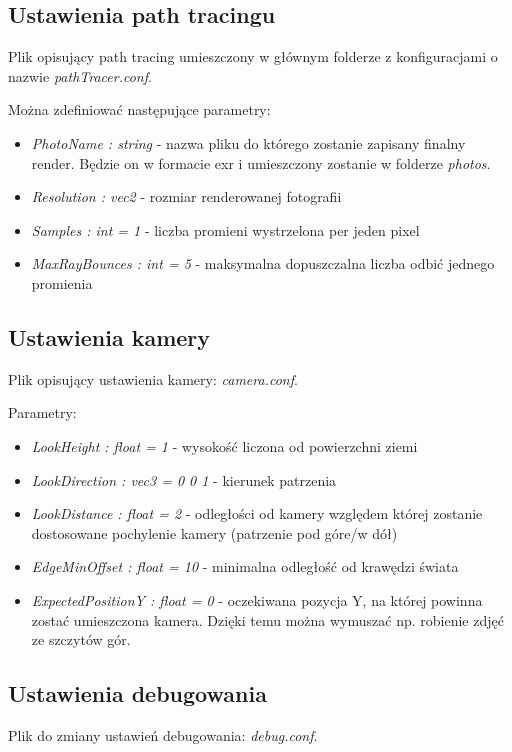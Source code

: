 \documentclass[inz,longabstract]{iithesis}
\begin{document}
        \subsection{Ustawienia path tracingu}
        Plik opisujący path tracing umieszczony w głównym folderze z konfiguracjami o nazwie \textit{pathTracer.conf}.
        
        Można zdefiniować następujące parametry:
        \begin{itemize}
            \item \textit{PhotoName : string} - nazwa pliku do którego zostanie zapisany finalny render. Będzie on w formacie exr i umieszczony zostanie w folderze \textit{photos}.
            \item \textit{Resolution : vec2} - rozmiar renderowanej fotografii
            \item \textit{Samples : int = 1} - liczba promieni wystrzelona per jeden pixel
            \item \textit{MaxRayBounces : int = 5} - maksymalna dopuszczalna liczba odbić jednego promienia  
        \end{itemize}

        \subsection{Ustawienia kamery}
        Plik opisujący ustawienia kamery: \textit{camera.conf}.
        
        Parametry:
        \begin{itemize}
            \item \textit{LookHeight : float = 1} - wysokość liczona od  powierzchni ziemi 
            \item \textit{LookDirection : vec3 = 0 0 1} - kierunek patrzenia 
            \item \textit{LookDistance : float = 2} - odległości od kamery względem której zostanie dostosowane pochylenie kamery (patrzenie pod góre/w dół)
            \item \textit{EdgeMinOffset : float = 10} - minimalna odległość od krawędzi świata  
            \item \textit{ExpectedPositionY : float = 0} - oczekiwana pozycja Y, na której powinna zostać umieszczona kamera. Dzięki temu można wymuszać np. robienie zdjęć ze szczytów gór. 
        \end{itemize}
        
        \subsection{Ustawienia debugowania}
        Plik do zmiany ustawień debugowania: \textit{debug.conf}.
        
\end{document}
